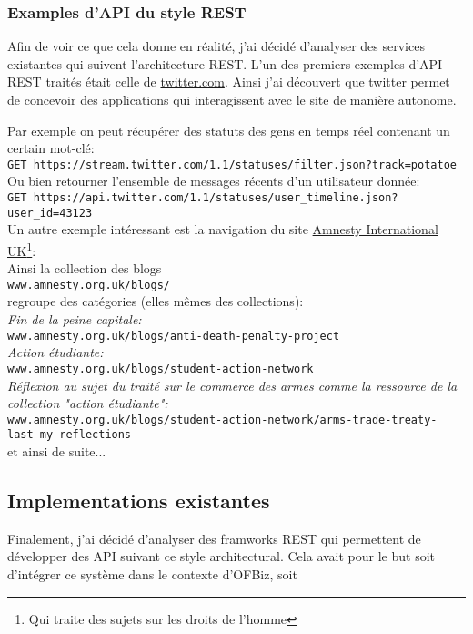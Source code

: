 \subsubsection{Examples d'API du style REST}
Afin de voir ce que cela donne en réalité, j'ai décidé d'analyser des services existantes qui suivent l'architecture REST. 
L'un des premiers exemples d'API REST traités était celle de \href{https://twitter.com/}{twitter.com}. Ainsi j'ai découvert que twitter permet de concevoir des applications qui interagissent avec le site de manière autonome. 

Par exemple on peut récupérer des statuts des gens en temps réel contenant un certain mot-clé: \\
\verb|GET https://stream.twitter.com/1.1/statuses/filter.json?track=potatoe|\\

Ou bien retourner l'ensemble de messages récents d'un utilisateur donnée:\\
\verb|GET https://api.twitter.com/1.1/statuses/user_timeline.json?user_id=43123|
\\

Un autre exemple intéressant est la navigation du site  \href{https://www.amnesty.org.uk/}{Amnesty International UK}\footnote{ Qui traite des sujets sur les droits de l'homme}:
\\
Ainsi la collection des blogs \\
\verb|www.amnesty.org.uk/blogs/|\\
regroupe des catégories (elles mêmes des collections): \\
 \emph{Fin de la peine capitale:} \\
 \verb|www.amnesty.org.uk/blogs/anti-death-penalty-project|\\
 \emph{Action étudiante:}\\
 \verb|www.amnesty.org.uk/blogs/student-action-network|\\
 \emph{Réflexion au sujet du traité sur le commerce des armes comme la ressource de la collection "action étudiante":} \\
 \verb|www.amnesty.org.uk/blogs/student-action-network/arms-trade-treaty-last-my-reflections| \\
 et ainsi de suite...
 

\subsection{Implementations existantes}
Finalement, j'ai décidé d'analyser des framworks REST qui permettent de développer des API suivant ce style architectural. Cela avait pour le but soit d'intégrer ce système dans le contexte d'OFBiz, soit 
